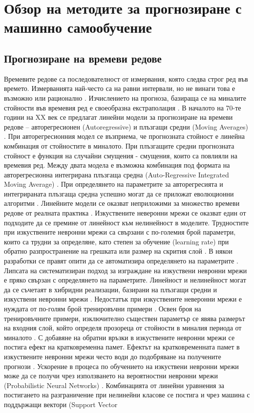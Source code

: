 ﻿\chapter{Обзор на методите за прогнозиране с машинно самообучение}

\section{Прогнозиране на времеви редове}

Времевите редове са последователност от измервания, която следва строг ред във времето. Измерванията най-често са на равни интервали, но не винаги това е възможно или рационално \cite{Shen-01}. Изчислението на прогноза, базираща се на миналите стойности във времевия ред е своеобразна екстраполация \cite{Khashei-03}. В началото на 70-те години на XX век \cite{Gooijer-01} се предлагат линейни модели за прогнозиране на времеви редове – авторегресионен (Autoregressive) и плъзгащи средни (Moving Averages) \cite{Tealab-01}. При авторегресионния модел се възприема, че прогнозната стойност е линейна комбинация от стойностите в миналото. При плъзгащите средни прогнозната стойност е функция на случайни смущения - смущения, които са повлияли на времевия ред. Между двата модела е възможна комбинация под формата на авторегресионна интегрирана плъзгаща средна (Auto-Regressive Integrated Moving Average) \cite{Khashei-01}. При определянето на параметрите за авторегресията и интегрираната плъзгаща средна успешно могат да се приложат еволюционни алгоритми \cite{Cortez-01}. Линейните модели се оказват неприложими за множество времеви редове от реалната практика \cite{Bontempi-01}. Изкуствените неверонни мрежи се оказват един от подходите да се премине от линейност \cite{Zhang-03} към нелинейност в моделите. Трудностите при изкуствените невронни мрежи са свързани с по-големия брой параметри, които са трудни за определяне, като степен за обучение (learning rate) при обратно разпространение на грешката или размер на скрития слой \cite{Tang-01}. В някои разработки се правят опити да се автоматизира определянето на параметрите \cite{Yan-01}. Липсата на систематизиран подход за изграждане на изкуствени невронни мрежи \cite{Qi-01} е пряко свързан с определянето на параметрите. Линейност и нелинейност могат да се съчетаят в хибридни реализации, базирани на плъзгащи средни и изкуствени невронни мрежи \cite{Zhang-01}. Недостатък при изкуствените неверонни мрежи е нуждата от по-голям брой тренировъчни примери \cite{Lachtermacher-01}. Освен броя на тренировъчните примери, изключително съществен параметър се явява размерът на входния слой, който определя прозореца от стойности в миналия периода от миналото \cite{Chen-01}. С добавяне на обратни връзки в изкуствените невронни мрежи се постига ефект на кратковременна памет. Ефектът на кратковременната памет в изкуствените невронни мрежи често води до подобряване на получените прогнози \cite{Cao-02}. Ускорение в процеса по обучението на изкуствени невронни мрежи може да се получи чрез използването на вероятностни невронни мрежи (Probabilistic Neural Networks) \cite{Khashei-02}. Комбинацията от линейни уравнения за постигането на разграничение при нелинейни класове се постига и чрез машина с поддържащи вектори (Support Vector 